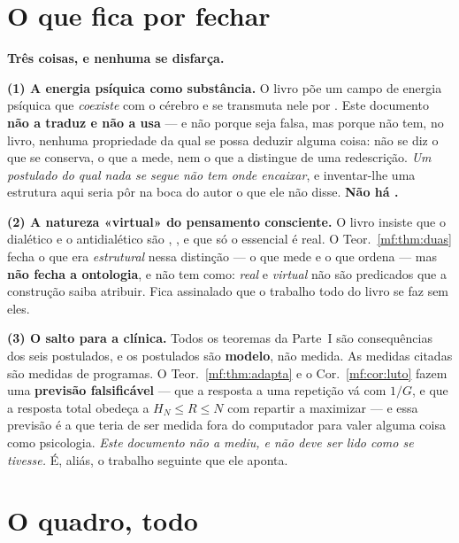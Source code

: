 \documentclass[../livro.tex]{subfiles}
\begin{document}
\section{O que fica por fechar}\label{mf:aberto}

\noindent\textbf{Três coisas, e nenhuma se disfarça.}

\medskip\noindent\textbf{(1) A energia psíquica como substância.} O livro põe um
campo de energia psíquica que \emph{coexiste} com o cérebro e se transmuta nele
por . Este documento \textbf{não a traduz e não a
usa} --- e não porque seja falsa, mas porque não tem, no livro, nenhuma
propriedade da qual se possa deduzir alguma coisa: não se diz o que se conserva,
o que a mede, nem o que a distingue de uma redescrição. \emph{Um postulado do
qual nada se segue não tem onde encaixar}, e inventar-lhe uma estrutura aqui
seria pôr na boca do autor o que ele não disse. \textbf{Não há .}

\medskip\noindent\textbf{(2) A natureza «virtual» do pensamento consciente.} O
livro insiste que o dialético e o antidialético são ,
, e que só o essencial é real. O
Teor.~\ref{mf:thm:duas} fecha o que era \emph{estrutural} nessa distinção --- o
que mede e o que ordena --- mas \textbf{não fecha a ontologia}, e não tem como:
\emph{real} e \emph{virtual} não são predicados que a construção saiba atribuir.
Fica assinalado que o trabalho todo do livro se faz sem eles.

\medskip\noindent\textbf{(3) O salto para a clínica.} Todos os teoremas da
Parte~I são consequências dos seis postulados, e os postulados são
\textbf{modelo}, não medida. As medidas citadas são medidas de programas. O
Teor.~\ref{mf:thm:adapta} e o Cor.~\ref{mf:cor:luto} fazem uma
\textbf{previsão falsificável} --- que a resposta a uma repetição vá com $1/G$, e
que a resposta total obedeça a $H_N\le R\le N$ com repartir a maximizar --- e
essa previsão é a que teria de ser medida fora do computador para valer alguma
coisa como psicologia. \emph{Este documento não a mediu, e não deve ser lido como
se tivesse.} É, aliás, o trabalho seguinte que ele aponta.

\section{O quadro, todo}\label{mf:quadro}
\end{document}
